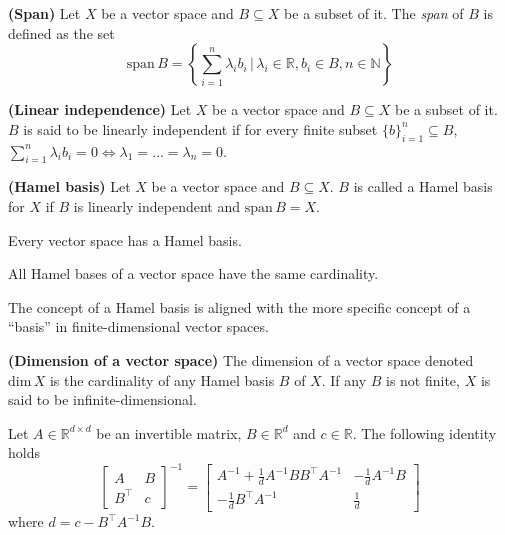 \begin{definition}
	\textbf{(Span)}
	Let $X$ be a vector space and $B \subseteq X$ be a subset of it. The \textit{span} of $B$ is defined as the set
	\begin{equation}
		\text{span}\,B = \left\{ \sum_{i=1}^n \lambda_i b_i \, | \, \lambda_i \in \mathbb{R}, b_i \in B, n \in \mathbb{N} \right\} 
	\end{equation}
\end{definition}

\begin{definition}
	\textbf{(Linear independence)}
	Let $X$ be a vector space and $B \subseteq X$ be a subset of it. $B$ is said to be linearly independent if for every finite subset $\{b\}_{i=1}^n \subseteq B$, $\sum_{i=1}^n \lambda_i b_i = 0 \iff \lambda_1=\dots=\lambda_n = 0$.
\end{definition}

\begin{definition}
	\textbf{(Hamel basis)}
	Let $X$ be a vector space and $B \subseteq X$. $B$ is called a Hamel basis for $X$ if $B$ is linearly independent and $\text{span}\,B = X$.
\end{definition}

\begin{proposition}
	Every vector space has a Hamel basis.
\end{proposition}

\begin{proposition}
	All Hamel bases of a vector space have the same cardinality.
\end{proposition}

The concept of a Hamel basis is aligned with the more specific concept of a ``basis'' in finite-dimensional vector spaces. 

\begin{definition}
	\textbf{(Dimension of a vector space)}
	The dimension of a vector space denoted $\text{dim}\,X$ is the cardinality of any Hamel basis $B$ of $X$. If any $B$ is not finite, $X$ is said to be infinite-dimensional.
\end{definition}

\begin{proposition}
	Let $A \in \mathbb{R}^{d\times d}$ be an invertible matrix, $B \in \mathbb{R}^d$ and $c \in \mathbb{R}$. The following identity holds
	\begin{equation}
		\label{eq.matrix_inv_lemma}
		\begin{bmatrix}
			A & B \\
			B^\top & c
		\end{bmatrix}^{-1} 
		= 	\begin{bmatrix}
			A^{-1} + \frac{1}{d}A^{-1}BB^\top A^{-1} & - \frac{1}{d}A^{-1}B \\[3pt]
			- \frac{1}{d}B^\top A^{-1} & \frac{1}{d}
		\end{bmatrix}
	\end{equation}
	where $d = c - B^\top A^{-1} B$.
\end{proposition}


